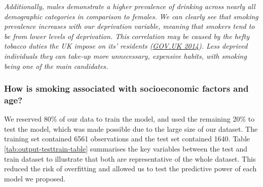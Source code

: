 \documentclass[
  11pt,
  twocolumn]{article}
\begin{document}
\emph{Additionally, males demonstrate a higher prevalence of drinking
across nearly all demographic categories in comparison to females.}
\emph{We can clearly see that smoking prevalence increases with our
deprivation variable, meaning that smokers tend to be from lower levels
of deprivation. This correlation may be caused by the hefty tobacco
duties the UK impose on its' residents
(\protect\hyperlink{ref-GovUK}{GOV.UK 2014}). Less deprived individuals
they can take-up more unnecessary, expensive habits, with smoking being
one of the main candidates.}

\hypertarget{how-is-smoking-associated-with-socioeconomic-factors-and-age}{%
\subsubsection{How is smoking associated with socioeconomic factors and
age?}\label{how-is-smoking-associated-with-socioeconomic-factors-and-age}}

We reserved 80\% of our data to train the model, and used the remaining
20\% to test the model, which was made possible due to the large size of
our dataset. The training set contained 6561 observations and the test
set contained 1640. Table \ref{tab:output-testtrain-table} summarises
the key variables between the test and train dataset to illustrate that
both are representative of the whole dataset. This reduced the risk of
overfitting and allowed us to test the predictive power of each model we
proposed.
\end{document}
